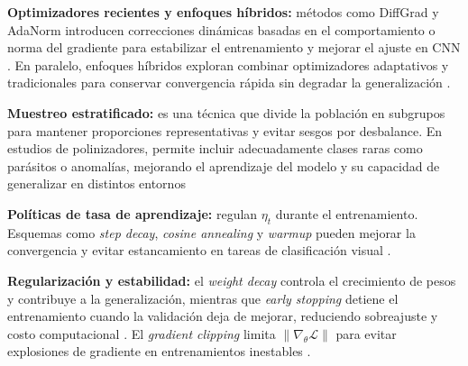 \par\indent\textbullet\hspace{0.2cm} \textbf{Optimizadores recientes y enfoques híbridos:} métodos como DiffGrad y AdaNorm introducen correcciones dinámicas basadas en el comportamiento o norma del gradiente para estabilizar el entrenamiento y mejorar el ajuste en CNN \parencite{Dubey2020,Dubey2023}. En paralelo, enfoques híbridos exploran combinar optimizadores adaptativos y tradicionales para conservar convergencia rápida sin degradar la generalización \parencite{Pattanaik2025}. 

\par\indent\textbullet\hspace{0.2cm} \textbf{Muestreo estratificado:} es una técnica que divide la población en subgrupos para mantener proporciones representativas y evitar sesgos por desbalance. En estudios de polinizadores, permite incluir adecuadamente clases raras como parásitos o anomalías, mejorando el aprendizaje del modelo y su capacidad de generalizar en distintos entornos \parencite{lee2025enhancing}

\par\indent\textbullet\hspace{0.2cm} \textbf{Políticas de tasa de aprendizaje:} regulan $\eta_t$ durante el entrenamiento. Esquemas como \textit{step decay}, \textit{cosine annealing} y \textit{warmup} pueden mejorar la convergencia y evitar estancamiento en tareas de clasificación visual \parencite{Xue2022}.

\par\indent\textbullet\hspace{0.2cm} \textbf{Regularización y estabilidad:} el \textit{weight decay} controla el crecimiento de pesos y contribuye a la generalización, mientras que \textit{early stopping} detiene el entrenamiento cuando la validación deja de mejorar, reduciendo sobreajuste y costo computacional \parencite{Azis2025,Loganathan2025}. El \textit{gradient clipping} limita $\|\nabla_{\theta}\mathcal{L}\|$ para evitar explosiones de gradiente en entrenamientos inestables \parencite{Xue2022}.
